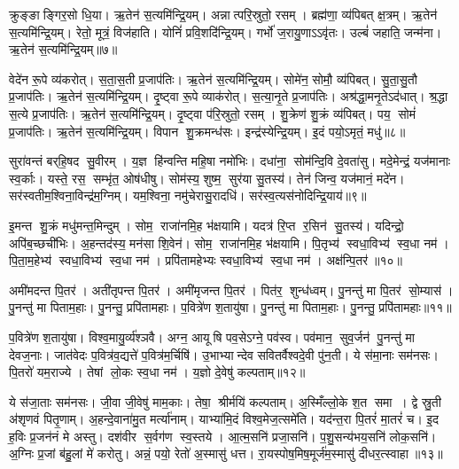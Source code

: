 क्रुङ्ङाङ्गिर॒सो धि॒या।
ऋ॒तेन॑ स॒त्यमि॑न्द्रि॒यम्।
अन्नात्परि॒स्रुतो॒ रसम्।
ब्रह्म॑णा॒ व्य॑पिबत् क्ष॒त्रम्।
ऋ॒तेन॑ स॒त्यमि॑न्द्रि॒यम्।
रेतो॒ मूत्रं॒ विज॑हाति।
योनिं॑ प्रवि॒शदि॑न्द्रि॒यम्।
गर्भो॑ ज॒रायु॒णाऽऽवृ॑तः।
उल्बं॑ जहाति॒ जन्म॑ना।
ऋ॒तेन॑ स॒त्यमि॑न्द्रि॒यम्॥७॥

वेदे॑न रू॒पे व्य॑करोत्।
स॒ता॒स॒ती प्र॒जाप॑तिः।
ऋ॒तेन॑ स॒त्यमि॑न्द्रि॒यम्।
सोमे॑न॒ सोमौ॒ व्य॑पिबत्।
सु॒ता॒सु॒तौ प्र॒जाप॑तिः।
ऋ॒तेन॑ स॒त्यमि॑न्द्रि॒यम्।
दृ॒ष्ट्वा रू॒पे व्याक॑रोत्।
स॒त्या॒नृ॒ते प्र॒जाप॑तिः।
अश्र॑द्धा॒मनृ॒तेऽद॑धात्।
श्र॒द्धा स॒त्ये प्र॒जाप॑तिः।
ऋ॒तेन॑ स॒त्यमि॑न्द्रि॒यम्।
दृ॒ष्ट्वा प॑रि॒स्रुतो॒ रसम्।
शु॒क्रेण॑ शु॒क्रं व्य॑पिबत्।
पय॒ सोमं॑ प्र॒जाप॑तिः।
ऋ॒तेन॑ स॒त्यमि॑न्द्रि॒यम्।
विपान शु॒क्रमन्ध॑सः।
इन्द्र॑स्येन्द्रि॒यम्।
इ॒दं पयो॒ऽमृतं॒ मधु॑॥८॥\anuvakamend[अ॒द्भ्यः क्षी॒रं व्य॑पिब॒ज्जन्म॑न॒र्तेन॑ स॒त्यमि॑न्द्रि॒य श्र॒द्धा स॒त्ये प्र॒जाप॑तिर॒ष्टौ च॑]

सुरा॑वन्तं बर्‌हि॒षद सु॒वीरम्।
य॒ज्ञ हि॑न्वन्ति महि॒षा नमो॑भिः।
दधा॑ना॒ सोम॑न्दि॒वि दे॒वता॑सु।
मदे॒मेन्द्रं॒ यज॑मानाः स्व॒र्काः।
यस्ते॒ रस॒ सम्भृ॑त॒ ओष॑धीषु।
सोम॑स्य॒ शुष्म॒ सुर॑या सु॒तस्य॑।
तेन॑ जिन्व॒ यज॑मानं॒ मदे॑न।
सर॑स्वतीम॒श्विना॒विन्द्र॑म॒ग्निम्।
यम॒श्विना॒ नमु॑चेरासु॒रादधि॑।
सर॑स्व॒त्यस॑नोदिन्द्रि॒याय॑॥९॥

इ॒मन्त शु॒क्रं मधु॑मन्त॒मिन्दुम्।
सोम॒ राजा॑नमि॒ह भ॑क्षयामि।
यदत्र॑ रि॒प्त र॒सिन॑ सु॒तस्य॑।
यदिन्द्रो॒ अपि॑ब॒च्छची॑भिः।
अ॒हन्तद॑स्य॒ मन॑सा शि॒वेन॑।
सोम॒ राजा॑नमि॒ह भ॑क्षयामि।
पि॒तृभ्य॑ स्वधा॒विभ्य॑ स्व॒धा नम॑।
पि॒ता॒म॒हेभ्य॑ स्वधा॒विभ्य॑ स्व॒धा नम॑।
प्रपि॑तामहेभ्यः स्वधा॒विभ्य॑ स्व॒धा नम॑।
अक्ष॑न्पि॒तर॑॥१०॥

अमी॑मदन्त पि॒तर॑।
अती॑तृपन्त पि॒तर॑।
अमी॑मृजन्त पि॒तर॑।
पित॑र॒ शुन्ध॑ध्वम्।
पु॒नन्तु॑ मा पि॒तर॑ सो॒म्यास॑।
पु॒नन्तु॑ मा पिताम॒हाः।
पु॒नन्तु॒ प्रपि॑तामहाः।
प॒वित्रे॑ण श॒तायु॑षा।
पु॒नन्तु॑ मा पिताम॒हाः।
पु॒नन्तु॒ प्रपि॑तामहाः॥११॥

प॒वित्रे॑ण श॒तायु॑षा।
विश्व॒मायु॒र्व्य॑श्ञवै।
अग्न॒ आयूषि पव॒सेऽग्ने॒ पव॑स्व।
पव॑मान॒ सुव॒र्जन॑ पु॒नन्तु॑ मा देवज॒नाः।
जात॑वेदः प॒वित्र॑व॒द्यत्ते॑ प॒वित्र॑म॒र्चिषि॑।
उ॒भाभ्यान्देव सवितर्वैश्वदे॒वी पु॑न॒ती।
ये स॑मा॒नाः सम॑नसः।
पि॒तरो॑ यम॒राज्ये।
तेषां लो॒कः स्व॒धा नम॑।
य॒ज्ञो दे॒वेषु॑ कल्पताम्॥१२॥

ये स॑जा॒ताः सम॑नसः।
जी॒वा जी॒वेषु॑ माम॒काः।
तेषा॒ श्रीर्मयि॑ कल्पताम्।
अ॒स्मिँल्लो॒के श॒त समा।
द्वे स्रु॒ती अ॑शृणवं पितृ॒णाम्।
अ॒हन्दे॒वाना॑मु॒त मर्त्या॑नाम्।
याभ्या॑मि॒दं विश्व॒मेज॒त्समे॑ति।
यद॑न्त॒रा पि॒तरं॑ मा॒तरं॑ च।
इ॒द ह॒विः प्र॒जन॑नं मे अस्तु।
दश॑वीर स॒र्वग॑ण स्व॒स्तये।
आ॒त्म॒सनि॑ प्रजा॒सनि॑।
प॒शु॒सन्य॑भय॒सनि॑ लोक॒सनि॑।
अ॒ग्निः प्र॒जां ब॑हु॒लां मे॑ करोतु।
अन्नं॒ पयो॒ रेतो॑ अ॒स्मासु॑ धत्त।
रा॒यस्पोष॒मिष॒मूर्ज॑म॒स्मासु॑ दीधर॒त्स्वाहा॥१३॥\anuvakamend[इ॒न्द्रि॒याय॑ पि॒तर॑ श॒तायु॑षा पु॒नन्तु॑ मा पिताम॒हाः पु॒नन्तु॒ प्रपि॑तामहाः कल्पता स्व॒स्तये॒ पञ्च॑ च]

